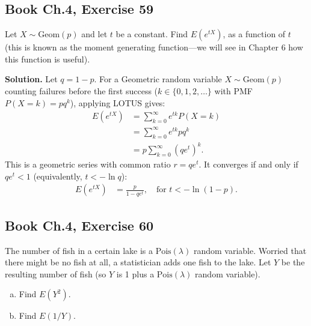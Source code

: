 \documentclass[11pt,a4paper]{article}
\begin{document}
\vspace{10pt}
\subsection{Book Ch.4, Exercise 59}
\begin{tcolorbox}[title={Book Ch.4, Exercise 59}]
Let $X \sim \text{Geom}(p)$ and let $t$ be a constant. Find $E(e^{tX})$, as a function of $t$ (this is known as the moment generating function---we will see in Chapter 6 how this function is useful).
\end{tcolorbox}

\noindent \textbf{Solution.} Let $q = 1 - p$. For a Geometric random variable $X \sim \text{Geom}(p)$ counting failures before the first success ($k \in \{0, 1, 2, \dots\}$ with PMF $P(X = k) = p q^k$), applying LOTUS gives:
\begin{align*}
E\left(e^{tX}\right) &= \sum_{k=0}^{\infty} e^{tk} P(X = k) \\
&= \sum_{k=0}^{\infty} e^{tk} p q^k \\
&= p \sum_{k=0}^{\infty} \left( q e^t \right)^k.
\end{align*}
This is a geometric series with common ratio $r = q e^t$. It converges if and only if $q e^t < 1$ (equivalently, $t < -\ln q$):
\begin{align*}
E\left(e^{tX}\right) &= \frac{p}{1 - q e^t}, \quad \text{for } t < -\ln(1 - p).
\end{align*}

\vspace{10pt}
\subsection{Book Ch.4, Exercise 60}
\begin{tcolorbox}[title={Book Ch.4, Exercise 60}]
The number of fish in a certain lake is a $\text{Pois}(\lambda)$ random variable. Worried that there might be no fish at all, a statistician adds one fish to the lake. Let $Y$ be the resulting number of fish (so $Y$ is 1 plus a $\text{Pois}(\lambda)$ random variable).
\begin{enumerate}[(a)]
\item Find $E(Y^2)$.
\item Find $E(1/Y)$.
\end{enumerate}
\end{tcolorbox}
\end{document}
